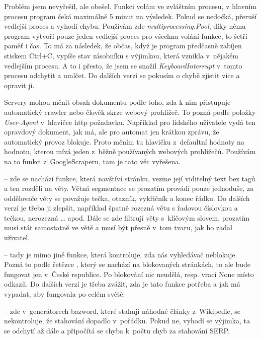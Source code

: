 	Problém jsem nevyřešil, ale obešel. Funkci volám ve zvláštním procesu,
	v hlavním procesu program čeká maximálně 5 minut na výsledek. Pokud se
	nedočká, přeruší vedlejší proces a vyhodí chybu. Používám
	zde {\it multiprocessing.Pool}, díky němu program vytvoří pouze jeden
	vedlejší proces pro všechna volání funkce, to šetří paměť i čas.  To má za
	následek, že občas, když je program předčasně zabíjen stiskem Ctrl+C,
	vypíše stav zásobníku s výjimkou, která vznikla v~nějakém vedlejším
	procesu. A to i přesto, že jsem se snažil {\it KeyboardInterrupt} v~tomto
	procesu odchytit a umlčet. Do dalších verzí se pokusím o chybě zjistit
	více a opravit ji.

	Servery mohou měnit obsah dokumentu podle toho, zda k nim přistupuje
	automatický crawler nebo člověk skrze webový prohlížeč. To pozná podle
	položky {\it User-Agent} v~hlavičce http požadavku. Například pro
	lidského uživatele vydá ten opravdový dokument, jak má, ale pro automat
	jen krátkou zprávu, že automatický provoz blokuje. 
	Proto měním tu hlavičku z~defaultní hodnoty na hodnotu, kterou mívá jeden
	z~běžně používaných webových prohlížečů. Používám na to funkci
	z~GoogleScraperu, tam je tato věc vyřešena.

\endlist
\:
 -- zde se nachází funkce, která navštíví stránku, vezme
její viditelný text bez tagů a ten rozdělí na věty. Větná segmentace se
prozatím provádí pouze jednoduše, za oddělovače věty se považuje tečka,
otazník, vykřičník a konec řádku. Do dalších verzí je třeba ji zlepšit,
například špatně rozezná větu s řadovou číslovkou a tečkou, nerozezná \dots
apod. Dále se zde filtrují věty s~klíčovým slovem, prozatím musí stát
samostatně ve větě a musí být přesně v~tom tvaru, jak ho zadal uživatel.
	
\:
 -- tady je mimo jiné funkce, která kontroluje, zda nás
vyhledávač neblokuje. Pozná to podle řetězce , který
se nachází na blokovaných stránkách, to ale bude fungovat jen v~České
republice. Po blokování nic neudělá, resp. vrací None místo odkazů. Do
dalších verzí je třeba zvážit, zda je tato funkce potřeba a jak má
vypadat, aby fungovala po celém světě.

\:
 -- zde v~generátorech bazword, které stahují náhodné
články z~Wikipedie, se nekontroluje, že stahování dopadlo v~pořádku. Pokud
ne, vyhodí se výjimka, ta se odchytí až dále a připočítá se chyba k~počtu chyb
za stahování SERP.

\endlist

